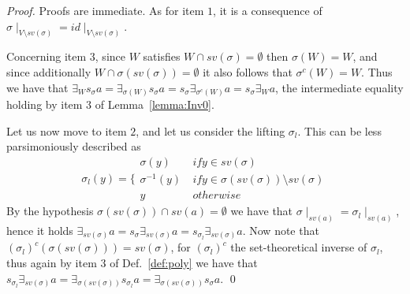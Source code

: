\documentclass{llncs}
\begin{document}
\begin{proof}
Proofs are immediate.
As for item $1$, it is a consequence of $\sigma \mid_{V \setminus sv(\sigma)} = id \mid_{V \setminus sv(\sigma)}$.

Concerning item $3$, since $W$ satisfies $W \cap sv(\sigma) = \emptyset$ then $\sigma(W) = W$,
and since additionally $W \cap \sigma(sv(\sigma)) = \emptyset$ it also follows that $\sigma^{c}(W) = W$. Thus
we have that 
$\exists_W s_{\sigma} a = \exists_{\sigma(W)} s_{\sigma} a = s_{\sigma} \exists_{\sigma^{c}(W)} a = s_{\sigma} \exists_W a$,
the intermediate equality holding by item 3 of Lemma~\ref{lemma:Inv0}.

Let us now move to item $2$, and let us consider the lifting $\sigma_l$. This can be less parsimoniously described as
%
$$\sigma_l(y) = \bigg \{\begin{array}{ll}
	\sigma(y) & \ if y \in sv(\sigma) \\
	\sigma^{-1}(y) & \ if y \in \sigma(sv(\sigma)) \setminus sv(\sigma) \\
	y & \ otherwise
	\end{array}$$
By the hypothesis $\sigma(sv(\sigma)) \cap sv(a) = \emptyset$ we have that $\sigma \mid_{sv(a)} = \sigma_l \mid_{sv(a)}$,
%
hence it holds $\exists_{sv(\sigma)} a = s_{\sigma} \exists_{sv(\sigma)} a = s_{\sigma_l} \exists_{sv(\sigma)} a$.
%
Now note that $(\sigma_l)^{c}(\sigma(sv(\sigma))) = sv(\sigma)$, for $(\sigma_l)^{c}$ the set-theoretical inverse of $\sigma_l$, 
thus again by item $3$ of Def.~\ref{def:poly} we have that $s_{\sigma_l} \exists_{sv(\sigma)} a = \exists_{\sigma(sv(\sigma))} s_{\sigma_l} a = \exists_{\sigma(sv(\sigma))} s_{\sigma} a$.
\qed
\end{proof}
\end{document}

